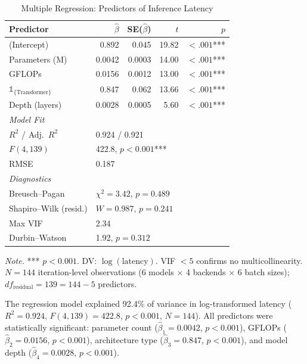 \documentclass[10pt,twocolumn,a4paper]{article}
\theoremstyle{definition}
\theoremstyle{plain}
\begin{document}
\begin{table}[t]
\centering
\caption{Multiple Regression: Predictors of Inference Latency}
\label{tab:regression}
\scriptsize
\setlength{\tabcolsep}{4pt}
\begin{tabular}{@{}lrrrr@{}}
\toprule
\textbf{Predictor} & \textbf{$\hat{\beta}$} & \textbf{SE($\hat{\beta}$)} & \textbf{$t$} & \textbf{$p$} \\
\midrule
(Intercept) & 0.892 & 0.045 & 19.82 & $<.001$*** \\
Parameters (M) & 0.0042 & 0.0003 & 14.00 & $<.001$*** \\
GFLOPs & 0.0156 & 0.0012 & 13.00 & $<.001$*** \\
$\mathbb{1}_{\{\text{Transformer}\}}$ & 0.847 & 0.062 & 13.66 & $<.001$*** \\
Depth (layers) & 0.0028 & 0.0005 & 5.60 & $<.001$*** \\
\midrule
\multicolumn{5}{l}{\textit{Model Fit}} \\
$R^2$ / Adj.\ $R^2$ & \multicolumn{4}{l}{0.924 / 0.921} \\
$F(4, 139)$ & \multicolumn{4}{l}{422.8, $p < 0.001$***} \\
RMSE & \multicolumn{4}{l}{0.187} \\
\midrule
\multicolumn{5}{l}{\textit{Diagnostics}} \\
Breusch--Pagan & \multicolumn{4}{l}{$\chi^2 = 3.42$, $p = 0.489$} \\
Shapiro--Wilk (resid.) & \multicolumn{4}{l}{$W = 0.987$, $p = 0.241$} \\
Max VIF & \multicolumn{4}{l}{2.34} \\
Durbin--Watson & \multicolumn{4}{l}{1.92, $p = 0.312$} \\
\bottomrule
\end{tabular}

\vspace{0.5em}
\noindent\textit{Note.} *** $p < 0.001$. DV: $\log(\text{latency})$. VIF $< 5$ confirms no multicollinearity. $N = 144$ iteration-level observations (6 models $\times$ 4 backends $\times$ 6 batch sizes); $df_{\text{residual}} = 139 = 144 - 5$ predictors.
\end{table}

The regression model explained 92.4\% of variance in log-transformed latency ($R^2 = 0.924$, $F(4, 139) = 422.8$, $p < 0.001$, $N = 144$). All predictors were statistically significant: parameter count ($\hat{\beta}_1 = 0.0042$, $p < 0.001$), GFLOPs ($\hat{\beta}_2 = 0.0156$, $p < 0.001$), architecture type ($\hat{\beta}_3 = 0.847$, $p < 0.001$), and model depth ($\hat{\beta}_4 = 0.0028$, $p < 0.001$).
\end{document}

